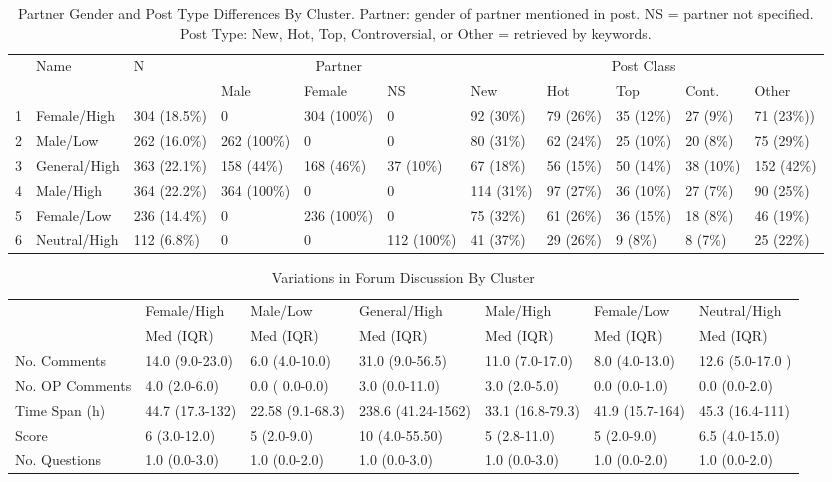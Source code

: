 \begin{table*}
\caption{Partner Gender and Post Type Differences By Cluster. Partner: gender of partner mentioned in post. NS = partner not specified. Post Type: New, Hot, Top, Controversial, or Other = retrieved by keywords. }
\small
\label{tab:clustdata}
\begin{tabular}{lll|lll|lllll}
\hline
  &  Name & N  & \multicolumn{3}{c}{Partner} & \multicolumn{5}{|c}{Post Class}  \\
 & & & Male & Female & NS & New & Hot & Top & Cont. & Other \\
\hline 
1 & Female/High & 304 (18.5\%) & 0 & 304 (100\%) & 0 & 92 (30\%) & 79 (26\%) &35 (12\%) & 27 (9\%) & 71 (23\%))\\
2 & Male/Low & 262 (16.0\%) & 262 (100\%) & 0 & 0 & 80 (31\%) & 62 (24\%) & 25 (10\%) & 20 (8\%) & 75 (29\%) \\
3 & General/High & 363 (22.1\%) & 158 (44\%) & 168 (46\%) & 37 (10\%) & 67 (18\%) & 56 (15\%) & 50 (14\%) & 38 (10\%) & 152 (42\%) \\
4 & Male/High & 364 (22.2\%) & 364 (100\%) & 0 &0 & 114  (31\%) & 97 (27\%) & 36 (10\%) & 27 (7\%) & 90 (25\%) \\
5 & Female/Low & 236 (14.4\%) & 0 & 236 (100\%) & 0 & 75  (32\%) & 61 (26\%) & 36 (15\%) & 18 (8\%) & 46 (19\%) \\
6 & Neutral/High & 112 (6.8\%) & 0 & 0 & 112 (100\%) & 41 (37\%) & 29 (26\%) &  9 (8\%) & 8 (7\%) & 25 (22\%) \\
\hline
\end{tabular}
\end{table*}


\begin{table*}
\caption{Variations in Forum Discussion By Cluster}
\small
\label{tab:postclusters}
\begin{tabular}{l|l|l|l|l|l|l}
\hline
 & Female/High & Male/Low & General/High & Male/High & Female/Low & Neutral/High \\
 & Med (IQR)& Med (IQR)& Med (IQR)& Med (IQR)& Med (IQR)& Med (IQR) \\
\hline
No. Comments & 14.0 (9.0-23.0)& 6.0 (4.0-10.0) &31.0 (9.0-56.5) &11.0 (7.0-17.0)&8.0 (4.0-13.0) &12.6 (5.0-17.0 ) \\
No. OP Comments & 4.0 (2.0-6.0) & 0.0 ( 0.0-0.0) &3.0 (0.0-11.0) &3.0 (2.0-5.0)&0.0 (0.0-1.0) &0.0 (0.0-2.0)\\
Time Span (h) & 44.7 (17.3-132)& 22.58 (9.1-68.3) &238.6 (41.24-1562) & 33.1 (16.8-79.3)& 41.9 (15.7-164)& 45.3 (16.4-111) \\
Score & 6 (3.0-12.0) & 5 (2.0-9.0)& 10 (4.0-55.50) & 5 (2.8-11.0)& 5 (2.0-9.0)& 6.5 (4.0-15.0) \\
No. Questions & 1.0 (0.0-3.0) & 1.0 (0.0-2.0) &1.0 (0.0-3.0) &1.0 (0.0-3.0) &1.0 (0.0-2.0) & 1.0 (0.0-2.0) \\
\hline
\end{tabular}
\end{table*}


